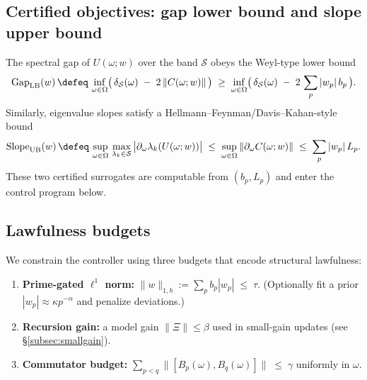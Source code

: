 \documentclass[11pt]{article}
\theoremstyle{plain}
\theoremstyle{definition}
\begin{document}
\subsection{Certified objectives: gap lower bound and slope upper bound}
The spectral gap of $U(\omega;w)$ over the band $\mathcal S$ obeys the Weyl-type lower bound
\begin{equation}\label{eq:gapLB}
  \mathrm{Gap}_{\mathrm{LB}}(w)
  \,\defeq\,\inf_{\omega\in\Omega}\bigl(\,\delta_{\mathcal S}(\omega)\; -\; 2\,\|C(\omega;w)\|\,\bigr)
  \;\ge\; \inf_{\omega\in\Omega}\bigl(\,\delta_{\mathcal S}(\omega)\; -\; 2\,\sum_{p}|w_p|\,b_p\,\bigr).
\end{equation}
Similarly, eigenvalue slopes satisfy a Hellmann--Feynman/Davis--Kahan-style bound
\begin{equation}\label{eq:slopeUB}
  \mathrm{Slope}_{\mathrm{UB}}(w)
  \,\defeq\,\sup_{\omega\in\Omega}\,\max_{\lambda_k\in\mathcal S}\,\bigl|\partial_\omega \lambda_k(U(\omega;w))\bigr|
  \;\le\; \sup_{\omega\in\Omega} \|\partial_\omega C(\omega;w)\|
  \;\le\; \sum_{p}|w_p|\,L_p.
\end{equation}
These two certified surrogates are computable from $(b_p,L_p)$ and enter the control program below.

\subsection{Lawfulness budgets}
We constrain the controller using three budgets that encode structural lawfulness:
\begin{enumerate}[leftmargin=*]
  \item \textbf{Prime-gated $\ell^1$ norm:} $\|w\|_{1,b}:=\sum_p b_p|w_p|\;\le\; \tau$. (Optionally fit a prior $|w_p|\approx \kappa p^{-\alpha}$ and penalize deviations.)
  \item \textbf{Recursion gain:} a model gain $\|\Xi\|\le \beta$ used in small-gain updates (see \S\ref{subsec:smallgain}).
  \item \textbf{Commutator budget:} $\sum_{p<q}\|[B_p(\omega),B_q(\omega)]\|\;\le\;\gamma$ uniformly in $\omega$.
\end{enumerate}
\end{document}
